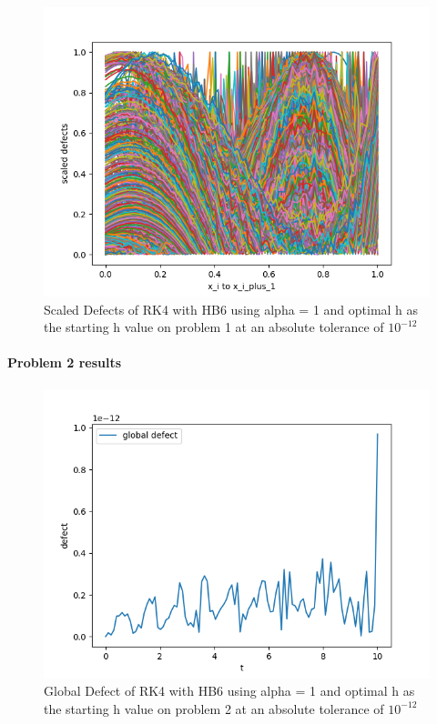 \documentclass{article}
\begin{document}
\begin{figure}[H]
\centering
\includegraphics[width=0.7\linewidth]{./figures/sharp_tolerance_rk4_with_hb6_p1_scaled_defects}
\caption{Scaled Defects of RK4 with HB6 using alpha = 1 and optimal h as the starting h value on problem 1 at an absolute tolerance of $10^{-12}$}
\label{fig:sharp_tolerance_rk4_with_hb6_p1_scaled_defects}
\end{figure}

\paragraph{Problem 2 results}
\begin{figure}[H]
\centering
\includegraphics[width=0.7\linewidth]{./figures/sharp_tolerance_rk4_with_hb6_p2_global_defect}
\caption{Global Defect of RK4 with HB6 using alpha = 1 and optimal h as the starting h value on problem 2 at an absolute tolerance of $10^{-12}$}
\label{fig:sharp_tolerance_rk4_with_hb6_p2_global_defect}
\end{figure}
\end{document}
